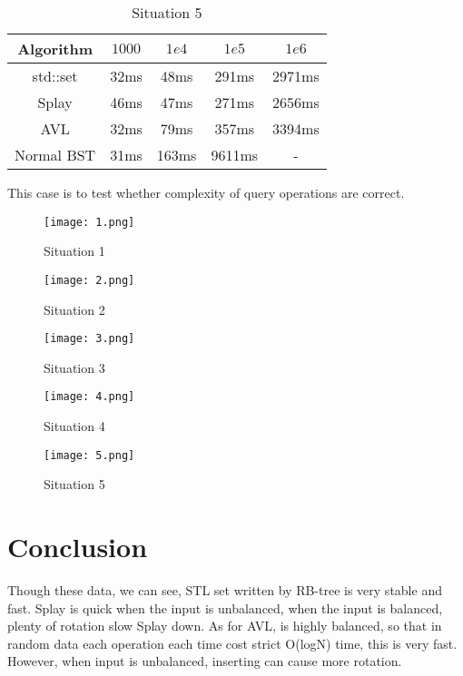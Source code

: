 \documentclass[UTF8]{report}
\numberwithin{figure}{subsection}
\numberwithin{table}{subsection}
\begin{document}
\begin{table}[h!t]
  \centering
  \begin{tabular}{ccccc}
    \toprule
    Algorithm & $1000$ & $1e4$ & $1e5$ & $1e6$\\
    \midrule
    std::set  &32ms&48ms&291ms&2971ms\\
    Splay     &46ms&47ms&271ms&2656ms\\
    AVL       &32ms&79ms&357ms&3394ms\\
    Normal BST&31ms&163ms&9611ms&-\\
    \bottomrule
  \end{tabular}
  \caption{Situation 5}
\end{table}

This case is to test whether complexity of query operations are correct.

\begin{figure}[h!t]
  \begin{minipage}{6cm}
    \centering
    \texttt{[image: 1.png]}
    \caption{Situation 1}
  \end{minipage}
  \begin{minipage}{6cm}
    \centering
    \texttt{[image: 2.png]}
    \caption{Situation 2}
  \end{minipage}
\end{figure}
\begin{figure}[h!t]
  \begin{minipage}{6cm}
    \centering
    \texttt{[image: 3.png]}
    \caption{Situation 3}
  \end{minipage}
  \begin{minipage}{6cm}
    \centering
    \texttt{[image: 4.png]}
    \caption{Situation 4}
  \end{minipage}
\end{figure}
\begin{figure}[h!t]
  \centering
  \texttt{[image: 5.png]}
  \caption{Situation 5}
\end{figure}

\chapter{Conclusion}
Though these data, we can see, STL set written by RB-tree is very stable and fast. 
Splay is quick when the input is unbalanced, when the input is balanced, 
plenty of rotation slow Splay down.
As for AVL, is highly balanced, so that in random data each operation each time 
cost strict O(logN) time, this is very fast. However, when input is unbalanced, 
inserting can cause more rotation. 
\end{document}
